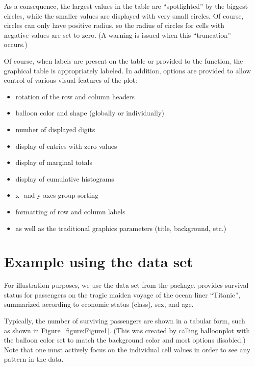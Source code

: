 \documentclass[a4paper]{report}
\begin{document}
\begin{article}
As a consequence, the largest values in the table are ``spotlighted''
by the biggest circles, while the smaller values are displayed
with very small circles.  Of course, circles can only have positive
radius, so the radius of circles for cells with negative values are
set to zero.  (A warning is issued when this ``truncation'' occurs.)

Of course, when labels are present on the table or provided to the
function, the graphical table is appropriately labeled.  In
addition, options are provided to allow control of various visual features
of the plot:

\begin{itemize}
  \item rotation of the row and column headers
  \item balloon color and shape (globally or individually)
  \item number of displayed digits
  \item display of entries with zero values
  \item display of marginal totals
  \item display of cumulative histograms
  \item x- and y-axes group sorting
  \item formatting of row and column labels
  \item as well as the traditional graphics parameters (title,
    background, etc.)
\end{itemize}

\section*{Example using the  data set}

For illustration purposes, we use the  data set from
the  package.   provides survival status
for passengers on the tragic maiden voyage of the ocean liner
``Titanic'', summarized according to economic status (class), sex, and
age.

Typically, the number of surviving passengers are shown in a tabular
form, such as shown in Figure~\ref{figure:Figure1}.  (This was created
by calling balloonplot with the balloon color set to match the
background color and most options disabled.)  Note that one must
actively focus on the individual cell values in order to see any
pattern in the data.


\end{article}
\end{document}
